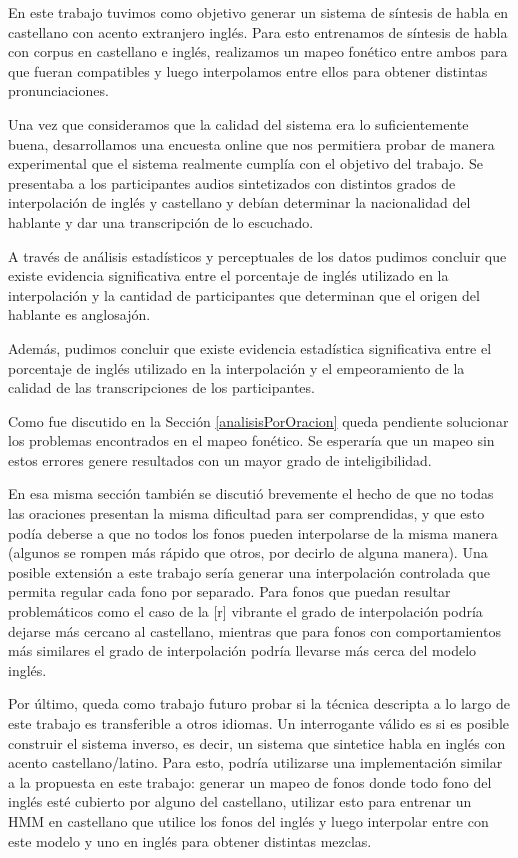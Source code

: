 En este trabajo tuvimos como objetivo generar un sistema de síntesis de habla en castellano con acento extranjero inglés. Para esto entrenamos  de síntesis de habla con corpus en castellano e inglés, realizamos un mapeo fonético entre ambos para que fueran compatibles y luego interpolamos entre ellos para obtener distintas pronunciaciones.

Una vez que consideramos que la calidad del sistema era lo suficientemente buena, desarrollamos una encuesta online que nos permitiera probar de manera experimental que el sistema realmente cumplía con el objetivo del trabajo. Se presentaba a los participantes audios sintetizados con distintos grados de interpolación de inglés y castellano y debían determinar la nacionalidad del hablante y dar una transcripción de lo escuchado.

A través de análisis estadísticos y perceptuales de los datos pudimos concluir que existe evidencia significativa entre el porcentaje de inglés utilizado en la interpolación y la cantidad de participantes que determinan que el origen del hablante es anglosajón.

Además, pudimos concluir que existe evidencia estadística significativa entre el porcentaje de inglés utilizado en la interpolación y el empeoramiento de la calidad de las transcripciones de los participantes.

Como fue discutido en la Sección \ref{analisisPorOracion} queda pendiente solucionar los problemas encontrados en el mapeo fonético. Se esperaría que un mapeo sin estos errores genere resultados con un mayor grado de inteligibilidad.

En esa misma sección también se discutió brevemente el hecho de que no todas las oraciones presentan la misma dificultad para ser comprendidas, y que esto podía deberse a que no todos los fonos pueden interpolarse de la misma manera (algunos se rompen más rápido que otros, por decirlo de alguna manera). Una posible extensión a este trabajo sería generar una interpolación controlada que permita regular cada fono por separado. Para fonos que puedan resultar problemáticos como el caso de la [r] vibrante el grado de interpolación podría dejarse más cercano al castellano, mientras que para fonos con comportamientos más similares el grado de interpolación podría llevarse más cerca del modelo inglés.

Por último, queda como trabajo futuro probar si la técnica descripta a lo largo de este trabajo es transferible a otros idiomas. Un interrogante válido es si es posible construir el sistema inverso, es decir, un sistema que sintetice habla en inglés con acento castellano/latino. Para esto, podría utilizarse una implementación similar a la propuesta en este trabajo: generar un mapeo de fonos donde todo fono del inglés esté cubierto por alguno del castellano, utilizar esto para entrenar un HMM en castellano que utilice los fonos del inglés y luego interpolar entre con este modelo y uno en inglés para obtener distintas mezclas.